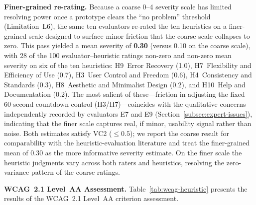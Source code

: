\documentclass[journal,onecolumn]{IEEEtran}
\begin{document}
\textbf{Finer-grained re-rating.} Because a coarse 0--4 severity scale has limited resolving power once a prototype clears the ``no problem'' threshold (Limitation~L6), the same ten evaluators re-rated the ten heuristics on a finer-grained scale designed to surface minor friction that the coarse scale collapses to zero. This pass yielded a mean severity of \textbf{0.30} (versus 0.10 on the coarse scale), with 28 of the 100 evaluator--heuristic ratings non-zero and non-zero mean severity on six of the ten heuristics: H9~Error Recovery (1.0), H7~Flexibility and Efficiency of Use (0.7), H3~User Control and Freedom (0.6), H4~Consistency and Standards (0.3), H8~Aesthetic and Minimalist Design (0.2), and H10~Help and Documentation (0.2). The most salient of these---friction in adjusting the fixed 60-second countdown control (H3/H7)---coincides with the qualitative concerns independently recorded by evaluators E7 and E9 (Section~\ref{subsec:expert-issues}), indicating that the finer scale captures real, if minor, usability signal rather than noise. Both estimates satisfy VC2 ($\leq 0.5$); we report the coarse result for comparability with the heuristic-evaluation literature and treat the finer-grained mean of 0.30 as the more informative severity estimate. On the finer scale the heuristic judgments vary across both raters and heuristics, resolving the zero-variance pattern of the coarse ratings.

\textbf{WCAG~2.1 Level~AA Assessment.} Table~\ref{tab:wcag-heuristic}
presents the results of the WCAG~2.1 Level~AA criterion assessment.
\end{document}
